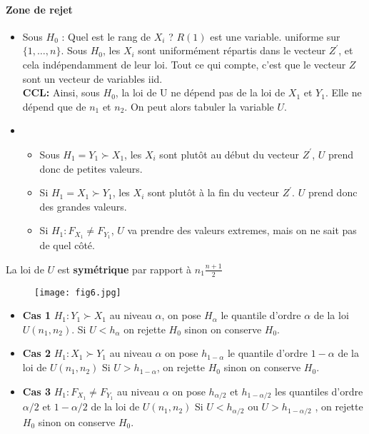 \documentclass{article}
\theoremstyle{plain}%
\theoremstyle{definition}
\theoremstyle{remark}
\begin{document}
\paragraph*{Zone de rejet}
\begin{itemize}
    \item Sous $ H_0 $ : Quel est le rang de $ X_i $ ? $ R(1) $ est une variable. uniforme sur $ \{1,\dots,n\} $. Sous $ H_0 $, les $ X_i $ sont uniformément répartis dans le vecteur $ Z^\prime  $, et cela indépendamment de leur loi. Tout ce qui compte, c'est que le vecteur $ Z $ sont un vecteur de variables iid. \\
    \textbf{CCL:} Ainsi, sous $ H_0 $, la loi de U ne dépend pas de la loi de $ X_1 $ et $ Y_1 $. Elle ne dépend que de $ n_1 $ et $ n_2 $. On peut alors tabuler la variable $ U $.
    \item \begin{itemize}
        \item Sous $ H_1 = Y_1 \succ X_1$, les $ X_i $ sont plutôt au début du vecteur $ Z^\prime $, $ U $ prend donc de petites valeurs.
        \item Si $ H_1 = X_1 \succ Y_1 $, les $ X_i $ sont plutôt à la fin du vecteur $ Z^\prime  $. $ U $  prend donc des grandes valeurs.
        \item Si $ H_1 : F_{X_1} \neq F_{Y_1} $, $ U $ va prendre des valeurs extremes, mais on ne sait pas de quel côté.
    \end{itemize}
\end{itemize}

La loi de $ U $ est \textbf{symétrique} par rapport à $ n_1 \frac{n+1}{2} $ 
\begin{figure}[!h]
    \centering
    \texttt{[image: fig6.jpg]}
\end{figure}

\begin{itemize}
    \item \textbf{Cas 1} $ H_1: Y_1 \succ X_1 $ au niveau $ \alpha $, on pose $ H_\alpha  $ le quantile d'ordre $ \alpha $ de la loi $ U(n_1, n_2) $. Si $ U < h_\alpha  $ on rejette $ H_0 $ sinon on conserve $ H_0 $.
    \item \textbf{Cas 2} $ H_1 : X_1 \succ Y_1 $ au niveau $ \alpha  $ on pose $ h_{1 - \alpha } $ le quantile d'ordre $ 1 - \alpha  $ de la loi de $ U(n_1, n_2) $ Si $ U > h_{1 - \alpha } $, on rejette $ H_0 $ sinon on conserve $ H_0 $.
    \item \textbf{Cas 3} $ H_1 : F_{X_1} \neq F_{Y_1} $ au niveau $ \alpha $ on pose $ h_{\alpha /2} $ et  $ h_{1 - \alpha/2 } $ les quantiles d'ordre $ \alpha /2 $ et $ 1 - \alpha/2  $ de la loi de $ U(n_1, n_2) $ Si $ U < h_{\alpha /2} $ ou $ U > h_{1 - \alpha /2} $ , on rejette $ H_0 $ sinon on conserve $ H_0 $.
\end{itemize}
\end{document}
